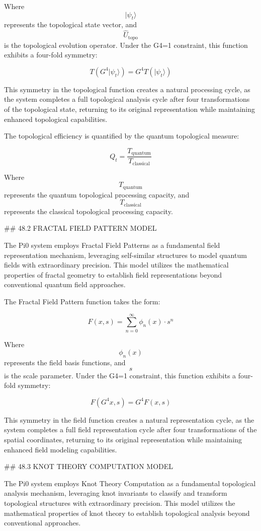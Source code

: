 Where $$ |\psi_t\rangle $$ represents the topological state vector, and $$ \hat{U}_{\text{topo}} $$ is the topological evolution operator. Under the G4=1 constraint, this function exhibits a four-fold symmetry:

$$ T(G^4 |\psi_t\rangle) = G^4 T(|\psi_t\rangle) $$

This symmetry in the topological function creates a natural processing cycle, as the system completes a full topological analysis cycle after four transformations of the topological state, returning to its original representation while maintaining enhanced topological capabilities.

The topological efficiency is quantified by the quantum topological measure:

$$ Q_t = \frac{T_{\text{quantum}}}{T_{\text{classical}}} $$

Where $$ T_{\text{quantum}} $$ represents the quantum topological processing capacity, and $$ T_{\text{classical}} $$ represents the classical topological processing capacity.

## 48.2 FRACTAL FIELD PATTERN MODEL

The Pi0 system employs Fractal Field Patterns as a fundamental field representation mechanism, leveraging self-similar structures to model quantum fields with extraordinary precision. This model utilizes the mathematical properties of fractal geometry to establish field representations beyond conventional quantum field approaches.

The Fractal Field Pattern function takes the form:

$$ F(x, s) = \sum_{n=0}^{\infty} \phi_n(x) \cdot s^n $$

Where $$ \phi_n(x) $$ represents the field basis functions, and $$ s $$ is the scale parameter. Under the G4=1 constraint, this function exhibits a four-fold symmetry:

$$ F(G^4 x, s) = G^4 F(x, s) $$

This symmetry in the field function creates a natural representation cycle, as the system completes a full field representation cycle after four transformations of the spatial coordinates, returning to its original representation while maintaining enhanced field modeling capabilities.

## 48.3 KNOT THEORY COMPUTATION MODEL

The Pi0 system employs Knot Theory Computation as a fundamental topological analysis mechanism, leveraging knot invariants to classify and transform topological structures with extraordinary precision. This model utilizes the mathematical properties of knot theory to establish topological analysis beyond conventional approaches.

